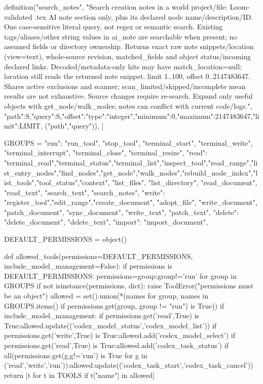     definition("search_notes", "Search creation notes in a world project/file: Loom-validated .tex AI note section only, plus its declared node name/description/ID. One case-sensitive literal query, not regex or semantic search. Existing tags/aliases/other string values in ai_note are searchable when present; no assumed fields or directory ownership. Returns exact raw note snippets/location (view=text), whole-source revision, matched_fields and object status/incoming declared links. Decoded/metadata-only hits may have match_location=null; location still reads the returned note snippet. limit 1..100, offset 0..2147483647. Shares active exclusions and scanner; scan_limited/skipped/incomplete mean results are not exhaustive. Source changes require re-search. Expand only useful objects with get_node/walk_nodes; notes can conflict with current code/logs.", {"path":S,"query":S,"offset":{"type":"integer","minimum":0,"maximum":2147483647},"limit":LIMIT}, ("path","query")),
]

GROUPS = {
    "run": {"run_tool", "stop_tool", "terminal_start", "terminal_write", "terminal_interrupt", "terminal_close", "terminal_resize"},
    "read": {"terminal_read","terminal_status","terminal_list","inspect_tool","read_range","list_entry_nodes","find_nodes","get_node","walk_nodes","rebuild_node_index","list_tools","tool_status","context", "list_files", "list_directory", "read_document", "read_text", "search_text", "search_notes"},
    "write": {"register_tool","edit_range","create_document", "adopt_file", "write_document", "patch_document", "sync_document", "write_text", "patch_text"},
    "delete": {"delete_document", "delete_text"},
    "import": {"import_document"},
}

DEFAULT_PERMISSIONS = object()

def allowed_tools(permissions=DEFAULT_PERMISSIONS, include_model_management=False):
    if permissions is DEFAULT_PERMISSIONS:
        permissions={group:group!='run' for group in GROUPS}
    if not isinstance(permissions, dict):
        raise ToolError("permissions must be an object")
    allowed = set().union(*(names for group, names in GROUPS.items() if permissions.get(group, group != "run") is True))
    if include_model_management:
        if permissions.get('read',True) is True:allowed.update(('codex_model_status','codex_model_list'))
        if permissions.get('write',True) is True:allowed.add('codex_model_select')
        if permissions.get('read',True) is True:allowed.add('codex_task_status')
        if all(permissions.get(g,g!='run') is True for g in ('read','write','run')):allowed.update(('codex_task_start','codex_task_cancel'))
    return [t for t in TOOLS if t["name"] in allowed]


